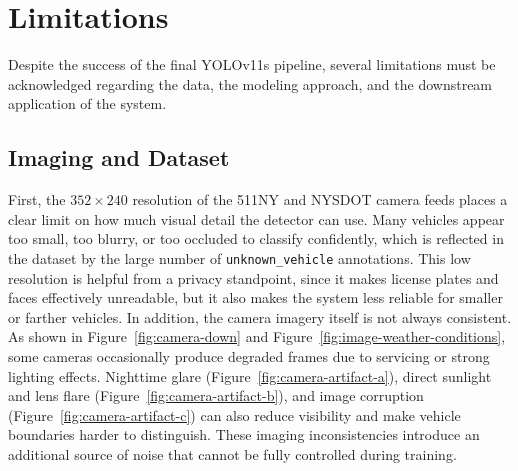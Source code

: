 \section{Limitations}

Despite the success of the final YOLOv11s pipeline, several limitations must be 
acknowledged regarding the data, the modeling approach, and the downstream application 
of the system.

\subsection{Imaging and Dataset}

First, the $352 \times 240$ resolution of the 511NY and NYSDOT camera feeds places
a clear limit on how much visual detail the detector can use. Many vehicles appear 
too small, too blurry, or too occluded to classify confidently, which is reflected
in the dataset by the large number of \verb|unknown_vehicle| annotations. This low 
resolution is helpful from a privacy standpoint, since it makes license plates and 
faces effectively unreadable, but it also makes the system less reliable for smaller
or farther vehicles. In addition, the camera imagery itself is not always consistent.
As shown in Figure~\ref{fig:camera-down} and Figure~\ref{fig:image-weather-conditions},
some cameras occasionally produce degraded frames due to servicing or strong lighting effects. 
Nighttime glare (Figure~\ref{fig:camera-artifact-a}), 
direct sunlight and lens flare (Figure~\ref{fig:camera-artifact-b}), 
and image corruption (Figure~\ref{fig:camera-artifact-c})
can also reduce visibility and make vehicle boundaries harder to distinguish. These 
imaging inconsistencies introduce an additional source of noise that cannot be fully 
controlled during training.

